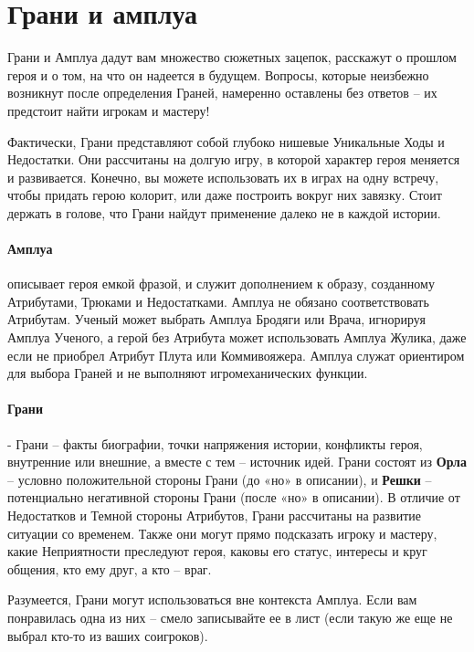 \section{Грани и амплуа}
Грани и Амплуа дадут вам множество сюжетных зацепок, расскажут о прошлом героя и о том, на что он надеется в будущем. Вопросы, которые неизбежно возникнут после определения Граней, намеренно оставлены без ответов – их предстоит найти игрокам и мастеру!
\begin{tcolorbox}
    Фактически, Грани представляют собой глубоко нишевые Уникальные Ходы и Недостатки. Они рассчитаны на долгую игру, в которой характер героя меняется и развивается. Конечно, вы можете использовать их в играх на одну встречу, чтобы придать герою колорит, или даже построить вокруг них завязку. Стоит держать в голове, что Грани найдут применение далеко не в каждой истории. 
\end{tcolorbox}
\paragraph{Амплуа} описывает героя емкой фразой, и служит дополнением к образу, созданному Атрибутами, Трюками и Недостатками. Амплуа не обязано соответствовать Атрибутам. Ученый может выбрать Амплуа Бродяги или Врача, игнорируя Амплуа Ученого, а герой без Атрибута может использовать Амплуа Жулика, даже если не приобрел Атрибут Плута или Коммивояжера. Амплуа служат ориентиром для выбора Граней и не выполняют игромеханических функции.
\paragraph{Грани} - Грани – факты биографии, точки напряжения истории, конфликты героя, внутренние или внешние, а вместе с тем – источник идей. Грани состоят из \textbf{Орла} – условно положительной стороны Грани (до «но» в описании), и \textbf{Решки} – потенциально негативной стороны Грани (после «но» в описании). 
\newline В отличие от Недостатков и Темной стороны Атрибутов, Грани рассчитаны на развитие ситуации со временем. Также они могут прямо подсказать игроку и мастеру, какие Неприятности преследуют героя, каковы его статус, интересы и круг общения, кто ему друг, а кто – враг.
\begin{tcolorbox}
    Разумеется, Грани могут использоваться вне контекста Амплуа. Если вам понравилась одна из них – смело записывайте ее в лист (если такую же еще не выбрал кто-то из ваших соигроков).
\end{tcolorbox}
